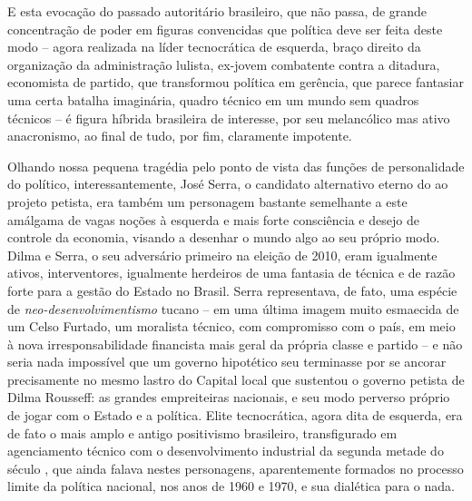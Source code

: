 E esta evocação do passado autoritário brasileiro, que não passa, de
grande concentração de poder em figuras convencidas que política deve
ser feita deste modo -- agora realizada na líder tecnocrática de
esquerda, braço direito da organização da administração lulista, ex-jovem 
combatente contra a ditadura, economista de partido, que
transformou política em gerência, que parece fantasiar uma certa batalha
imaginária, quadro técnico em um mundo sem quadros técnicos -- é figura
híbrida brasileira de interesse, por seu melancólico mas ativo
anacronismo, ao final de tudo, por fim, claramente impotente.

Olhando nossa pequena tragédia pelo ponto de vista das funções de
personalidade do político, interessantemente, José Serra, o candidato
alternativo eterno do  ao projeto petista, era também um personagem
bastante semelhante a este amálgama de vagas noções à esquerda e mais
forte consciência e desejo de controle da economia, visando a desenhar o
mundo algo ao seu próprio modo. Dilma e Serra, o seu adversário primeiro
na eleição de 2010, eram igualmente ativos, interventores, igualmente
herdeiros de uma fantasia de técnica e de razão forte para a gestão do
Estado no Brasil. Serra representava, de fato, uma espécie de
\emph{neo-desenvolvimentismo} tucano -- em uma última imagem muito
esmaecida de um Celso Furtado, um moralista técnico, com compromisso com
o país, em meio à nova irresponsabilidade financista mais geral da
própria classe e partido -- e não seria nada impossível que um governo
hipotético seu terminasse por se ancorar precisamente no mesmo lastro do
Capital local que sustentou o governo petista de Dilma Rousseff: as
grandes empreiteiras nacionais, e seu modo perverso próprio de jogar com
o Estado e a política. Elite tecnocrática, agora dita de esquerda, era
de fato o mais amplo e antigo positivismo brasileiro, transfigurado em
agenciamento técnico com o desenvolvimento industrial da segunda metade
do século , que ainda falava nestes personagens, aparentemente
formados no processo limite da política nacional, nos anos de 1960 e
1970, e sua dialética para o nada.

